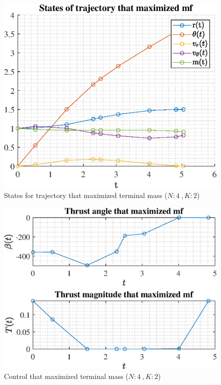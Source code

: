 \documentclass[]{article}
\begin{document}
	\begin{figure}
		\centering
		\includegraphics[scale=0.75]{states_N4_K2_C2_mf.eps}
		\caption{States for trajectory that maximized terminal mass (\(N:4\ , K:2\))}
		\label{fig:states_N4_K2_C2_mf}
	\end{figure}
	\begin{figure}
		\centering
		\includegraphics[scale=0.75]{control_N4_K2_C2_mf.eps}
		\caption{Control that maximized terminal mass (\(N:4\ , K:2\))}
		\label{fig:control_N4_K2_C2_mf}
	\end{figure}
\end{document}
